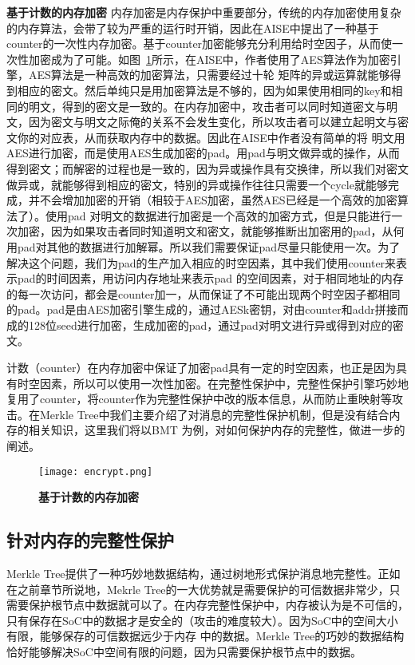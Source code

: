 \textbf{基于计数的内存加密}
内存加密是内存保护中重要部分，传统的内存加密使用复杂的内存算法，会带了较为严重的运行时开销，因此在AISE中提出了一种基于counter的一次性内存加密。基于counter加密能够充分利用给时空因子，从而使一次性加密成为了可能。如图~\ref{fig:encrypt.png}所示，在AISE中，作者使用了AES算法作为加密引擎，AES算法是一种高效的加密算法，只需要经过十轮
矩阵的异或运算就能够得到相应的密文。然后单纯只是用加密算法是不够的，因为如果使用相同的key和相同的明文，得到的密文是一致的。在内存加密中，攻击者可以同时知道密文与明文，因为密文与明文之际俺的关系不会发生变化，所以攻击者可以建立起明文与密文你的对应表，从而获取内存中的数据。因此在AISE中作者没有简单的将
明文用AES进行加密，而是使用AES生成加密的pad。用pad与明文做异或的操作，从而得到密文；而解密的过程也是一致的，因为异或操作具有交换律，所以我们对密文做异或，就能够得到相应的密文，特别的异或操作往往只需要一个cycle就能够完成，并不会增加加密的开销（相较于AES加密，虽然AES已经是一个高效的加密算法了）。使用pad
对明文的数据进行加密是一个高效的加密方式，但是只能进行一次加密，因为如果攻击者同时知道明文和密文，就能够推断出加密用的pad，从何用pad对其他的数据进行加解幂。所以我们需要保证pad尽量只能使用一次。为了解决这个问题，我们为pad的生产加入相应的时空因素，其中我们使用counter来表示pad的时间因素，用访问内存地址来表示pad
的空间因素，对于相同地址的内存的每一次访问，都会是counter加一，从而保证了不可能出现两个时空因子都相同的pad。pad是由AES加密引擎生成的，通过AESk密钥，对由counter和addr拼接而成的128位seed进行加密，生成加密的pad，通过pad对明文进行异或得到对应的密文。

计数（counter）在内存加密中保证了加密pad具有一定的时空因素，也正是因为具有时空因素，所以可以使用一次性加密。在完整性保护中，完整性保护引擎巧妙地复用了counter，将counter作为完整性保护中改的版本信息，从而防止重映射等攻击。在Merkle Tree中我们主要介绍了对消息的完整性保护机制，但是没有结合内存的相关知识，这里我们将以BMT
为例，对如何保护内存的完整性，做进一步的阐述。
\begin{figure}[!htp]
    \centering
    \texttt{[image: encrypt.png]}
    \caption{\textbf{基于计数的内存加密 }}
   \label{fig:encrypt.png}
\end{figure}

\subsection{针对内存的完整性保护}
Merkle Tree提供了一种巧妙地数据结构，通过树地形式保护消息地完整性。正如在之前章节所说地，Mekrle Tree的一大优势就是需要保护的可信数据非常少，只需要保护根节点中数据就可以了。在内存完整性保护中，内存被认为是不可信的，只有保存在SoC中的数据才是安全的（攻击的难度较大）。因为SoC中的空间大小有限，能够保存的可信数据远少于内存
中的数据。Merkle Tree的巧妙的数据结构恰好能够解决SoC中空间有限的问题，因为只需要保护根节点中的数据。

